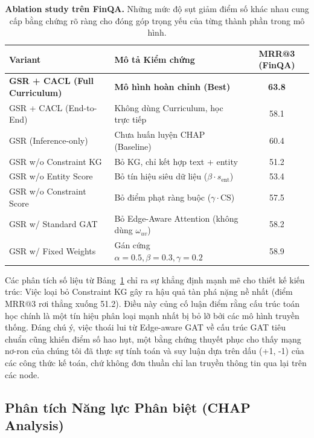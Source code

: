 \documentclass[10pt, a4paper]{article}
\begin{document}
\begin{table}[H]
\centering\small
\begin{tabular}{llc}
\toprule
Variant & Mô tả Kiểm chứng & MRR@3 (FinQA) \\
\midrule
\textbf{GSR + CACL (Full Curriculum)} & \textbf{Mô hình hoàn chỉnh (Best)} & \textbf{63.8} \\
GSR + CACL (End-to-End) & Không dùng Curriculum, học trực tiếp & 58.1 \\
GSR (Inference-only) & Chưa huấn luyện CHAP (Baseline) & 60.4 \\
\midrule
GSR w/o Constraint KG & Bỏ KG, chỉ kết hợp text + entity & 51.2 \\
GSR w/o Entity Score & Bỏ tín hiệu siêu dữ liệu ($\beta \cdot s_{\text{ent}}$) & 53.4 \\
GSR w/o Constraint Score & Bỏ điểm phạt ràng buộc ($\gamma \cdot \text{CS}$) & 57.5 \\
GSR w/ Standard GAT & Bỏ Edge-Aware Attention (không dùng $\omega_{uv}$) & 58.2 \\
GSR w/ Fixed Weights & Gán cứng $\alpha=0.5, \beta=0.3, \gamma=0.2$ & 58.9 \\
\bottomrule
\end{tabular}
\caption{\textbf{Ablation study trên FinQA.} Những mức độ sụt giảm điểm số khác nhau cung cấp bằng chứng rõ ràng cho đóng góp trọng yếu của từng thành phần trong mô hình.}
\label{tab:ablation}
\end{table}

Các phân tích số liệu từ Bảng~\ref{tab:ablation} chỉ ra sự khẳng định mạnh mẽ cho thiết kế kiến trúc: Việc loại bỏ Constraint KG gây ra hậu quả tàn phá nặng nề nhất (điểm MRR@3 rơi thẳng xuống 51.2). Điều này củng cố luận điểm rằng cấu trúc toán học chính là một tín hiệu phân loại mạnh nhất bị bỏ lỡ bởi các mô hình truyền thống. Đáng chú ý, việc thoái lui từ Edge-aware GAT về cấu trúc GAT tiêu chuẩn cũng khiến điểm số hao hụt, một bằng chứng thuyết phục cho thấy mạng nơ-ron của chúng tôi đã thực sự tính toán và suy luận dựa trên dấu (+1, -1) của các công thức kế toán, chứ không đơn thuần chỉ lan truyền thông tin qua lại trên các node.

\subsection{Phân tích Năng lực Phân biệt (CHAP Analysis)}
\end{document}
